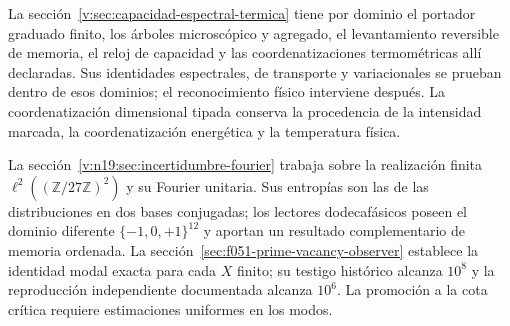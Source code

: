 La sección~\ref{v:sec:capacidad-espectral-termica} tiene por dominio el
portador graduado finito, los árboles microscópico y agregado, el
levantamiento reversible de memoria, el reloj de capacidad y las coordenatizaciones
termométricas allí declaradas. Sus identidades espectrales, de transporte y
variacionales se prueban dentro de esos dominios; el reconocimiento físico
interviene después. La coordenatización dimensional tipada conserva la procedencia de
la intensidad marcada, la coordenatización energética y la temperatura física.

La sección~\ref{v:n19:sec:incertidumbre-fourier} trabaja sobre la
realización finita \(\ell^2((\mathbb Z/27\mathbb Z)^2)\) y su
Fourier unitaria. Sus entropías son las de las distribuciones en dos bases
conjugadas; los lectores dodecafásicos poseen el dominio diferente
\(\{-1,0,+1\}^{12}\) y aportan un resultado complementario de memoria
ordenada. La sección~\ref{sec:f051-prime-vacancy-observer} establece la
identidad modal exacta para cada \(X\) finito; su testigo histórico alcanza
\(10^8\) y la reproducción independiente documentada alcanza \(10^6\).
La promoción a la cota crítica requiere estimaciones uniformes en los modos.
